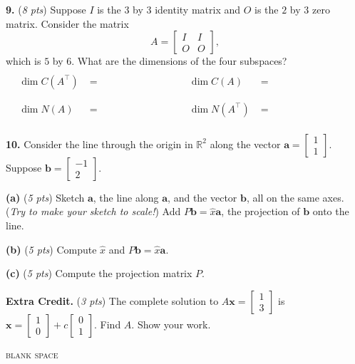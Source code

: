 \documentclass[11pt]{amsart}
\newcommand{\ba}{\mathbf{a}}
\newcommand{\bb}{\mathbf{b}}
\newcommand{\bx}{\mathbf{x}}
\newcommand{\RR}{{\mathbb{R}}}
\newcommand{\ds}{\displaystyle}
\newcommand{\prob}[1]{\bigskip\noindent\textbf{#1.} }
\newcommand{\pts}[1]{(\emph{#1 pts})}
\newcommand{\probpts}[2]{\prob{#1} \pts{#2} \quad}
\newcommand{\epartpts}[2]{\medskip\noindent \textbf{(#1)} \pts{#2} \quad}
\newcommand{\mybox}{\boxed{\phantom{\begin{bmatrix} I & I \\ O & O \end{bmatrix} fj ladsfj}}}
\begin{document}
\probpts{9}{8}  Suppose $I$ is the $3$ by $3$ identity matrix and $O$ is the $2$ by $3$ zero matrix.  Consider the matrix
    $$A = \begin{bmatrix} I & I \\ O & O \end{bmatrix},$$
which is $5$ by $6$.  What are the dimensions of the four subspaces?
\begin{align*}
\dim C(A^\top) &= \mybox & \dim C(A) &= \mybox \\
\dim N(A) &= \mybox & \dim N(A^\top) &= \mybox
\end{align*}
\bigskip


\clearpage
\newpage
\prob{10}  Consider the line through the origin in $\RR^2$ along the vector $\ds \ba = \begin{bmatrix} 1 \\ 1 \end{bmatrix}$.  Suppose $\bb = \begin{bmatrix} -1 \\ 2 \end{bmatrix}$.

\medskip
\epartpts{a}{5}  Sketch $\ba$, the line along $\ba$, and the vector $\bb$, all on the same axes.  (\emph{Try to make your sketch to scale!})  Add $P\bb = \hat x \ba$, the projection of $\bb$ onto the line.
\vspace{4.0in}

\epartpts{b}{5}  Compute $\hat x$ and $P\bb = \hat x \ba$.
\vfill

\epartpts{c}{5}  Compute the projection matrix $P$.
\vfill


\clearpage
\newpage
\probpts{Extra Credit}{3}  The complete solution to $A\bx = \begin{bmatrix} 1 \\ 3 \end{bmatrix}$ is $\bx = \begin{bmatrix} 1 \\ 0 \end{bmatrix} + c \begin{bmatrix} 0 \\ 1 \end{bmatrix}$.  Find $A$.  Show your work.
\vfill

\noindent \hrulefill
\begin{center}
\small
\textsc{blank space}
\end{center}
\vfill
\end{document}

